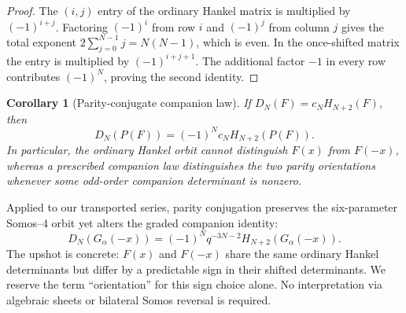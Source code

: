 \documentclass[11pt]{article}
\newtheorem{corollary}[theorem]{Corollary}
\theoremstyle{definition}
\theoremstyle{remark}
\begin{document}
\begin{proof}
The $(i,j)$ entry of the ordinary Hankel matrix is multiplied by
$(-1)^{i+j}$.  Factoring $(-1)^i$ from row $i$ and $(-1)^j$ from column $j$
gives the total exponent
$2\sum_{j=0}^{N-1}j=N(N-1)$, which is even.  In the once-shifted matrix the
entry is multiplied by $(-1)^{i+j+1}$.  The additional factor $-1$ in every
row contributes $(-1)^N$, proving the second identity.
\end{proof}

\begin{corollary}[Parity-conjugate companion law]
If $D_N(F)=c_NH_{N+2}(F)$, then
\begin{equation}
 D_N(P(F))=(-1)^Nc_NH_{N+2}(P(F)).
 \label{eq:parity-companion-law}
\end{equation}
In particular, the ordinary Hankel orbit cannot distinguish $F(x)$ from
$F(-x)$, whereas a prescribed companion law distinguishes the two parity
orientations whenever some odd-order companion determinant is nonzero.
\end{corollary}

Applied to our transported series, parity conjugation preserves the
six-parameter Somos--4 orbit yet alters the graded companion identity:
\begin{equation}
 D_N(G_\alpha(-x))=(-1)^Nq^{-3N-2}H_{N+2}(G_\alpha(-x)).
 \label{eq:transported-parity-companion}
\end{equation}
The upshot is concrete: $F(x)$ and $F(-x)$ share the same ordinary Hankel
determinants but differ by a predictable sign in their shifted determinants.
We reserve the term ``orientation'' for this sign choice alone. No interpretation
via algebraic sheets or bilateral Somos reversal is required.
\end{document}

